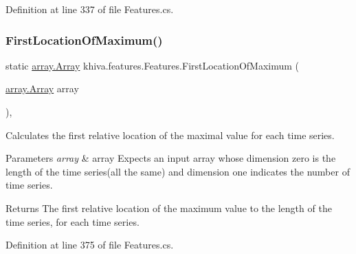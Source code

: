 Definition at line 337 of file Features.\+cs.

\mbox{\label{classkhiva_1_1features_1_1_features_a336ef7bbade66652a361d94acf475fc1}} 
\subsubsection{\texorpdfstring{First\+Location\+Of\+Maximum()}{FirstLocationOfMaximum()}}
{\footnotesize\ttfamily static \mbox{\hyperlink{classkhiva_1_1array_1_1_array}{array.\+Array}} khiva.\+features.\+Features.\+First\+Location\+Of\+Maximum (\begin{DoxyParamCaption}\item[{\mbox{\hyperlink{classkhiva_1_1array_1_1_array}{array.\+Array}}}]{array }\end{DoxyParamCaption})\hspace{0.3cm}{\ttfamily [inline]}, {\ttfamily [static]}}



Calculates the first relative location of the maximal value for each time series. 


\begin{DoxyParams}{Parameters}
{\em array} & array Expects an input array whose dimension zero is the length of the time series(all the same) and dimension one indicates the number of time series.\\
\hline
\end{DoxyParams}
\begin{DoxyReturn}{Returns}
The first relative location of the maximum value to the length of the time series, for each time series.
\end{DoxyReturn}


Definition at line 375 of file Features.\+cs.

\mbox{\label{classkhiva_1_1features_1_1_features_ac9bd93efc7e586df11c5208985794832}} 
